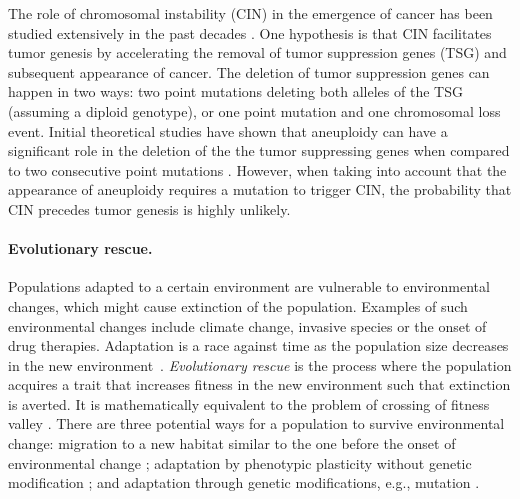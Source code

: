 \documentclass[12pt]{extarticle}
\begin{document}

The role of chromosomal instability (CIN) in the emergence of cancer has been studied extensively in the past decades \cite{michor2005can,christine2018understanding,nowak2002role,pavelka2010dr,komarova2003mutation,zhu2018cellular}.
One hypothesis is that CIN facilitates tumor genesis by accelerating the removal of tumor suppression genes (TSG) and subsequent appearance of cancer. The deletion of tumor suppression genes can happen in two ways: two point mutations deleting both alleles of the TSG (assuming a diploid genotype), or one point mutation and one chromosomal loss event.
Initial theoretical studies have shown that aneuploidy can have a significant role in the deletion of the the tumor suppressing genes when compared to two consecutive point mutations \cite{nowak2002role,komarova2003mutation,michor2005can,komarova2008selective}. %
However, when taking into account that the appearance of aneuploidy requires a mutation to trigger CIN, the probability that CIN precedes tumor genesis is highly unlikely.

\paragraph{Evolutionary rescue.} Populations adapted to a certain environment are vulnerable to environmental changes, which might cause extinction of the population. Examples of such environmental changes include climate change, invasive species or the onset of drug therapies. Adaptation is a race against time as the population size decreases in the new environment~\cite{tanaka2022surviving}. 
{\em Evolutionary rescue} is the process where the population acquires a trait that increases fitness in the new environment such that extinction is averted. It is mathematically equivalent to the problem of crossing of fitness valley \cite{weissman2009rate,weissman2010rate}.
There are three potential ways for a population to survive environmental change: migration to a new habitat similar to the one before the onset of environmental change \cite{cobbold2020should}; adaptation by phenotypic plasticity without genetic modification \cite{carja2019evolutionary,carja2017evolutionary,levien2021non}; and adaptation through genetic modifications, e.g., mutation \cite{uecker2014evolutionary,uecker2016role,uecker2011fixation}.
\end{document}
